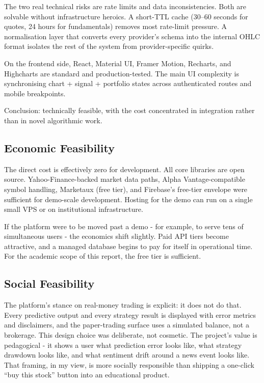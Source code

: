 \documentclass[12pt,a4paper]{report}
\numberwithin{equation}{chapter}
\begin{document}
The two real technical risks are rate limits and data inconsistencies. Both are solvable without infrastructure heroics. A short-TTL cache (30--60 seconds for quotes, 24 hours for fundamentals) removes most rate-limit pressure. A normalisation layer that converts every provider's schema into the internal OHLC format isolates the rest of the system from provider-specific quirks.

On the frontend side, React, Material UI, Framer Motion, Recharts, and Highcharts are standard and production-tested. The main UI complexity is synchronising chart + signal + portfolio states across authenticated routes and mobile breakpoints.

Conclusion: technically feasible, with the cost concentrated in integration rather than in novel algorithmic work.

\subsection{Economic Feasibility}

The direct cost is effectively zero for development. All core libraries are open source. Yahoo-Finance-backed market data paths, Alpha Vantage-compatible symbol handling, Marketaux (free tier), and Firebase's free-tier envelope were sufficient for demo-scale development. Hosting for the demo can run on a single small VPS or on institutional infrastructure.

If the platform were to be moved past a demo - for example, to serve tens of simultaneous users - the economics shift slightly. Paid API tiers become attractive, and a managed database begins to pay for itself in operational time. For the academic scope of this report, the free tier is sufficient.

\subsection{Social Feasibility}

The platform's stance on real-money trading is explicit: it does not do that. Every predictive output and every strategy result is displayed with error metrics and disclaimers, and the paper-trading surface uses a simulated balance, not a brokerage. This design choice was deliberate, not cosmetic. The project's value is pedagogical - it shows a user what prediction error looks like, what strategy drawdown looks like, and what sentiment drift around a news event looks like. That framing, in my view, is more socially responsible than shipping a one-click ``buy this stock'' button into an educational product.
\end{document}
